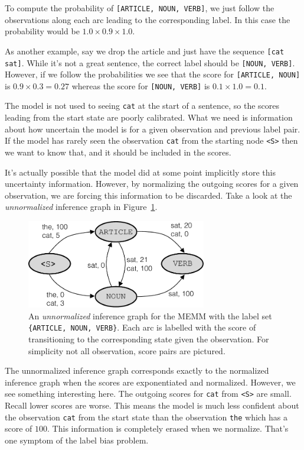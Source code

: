 \documentclass[11pt, letterpaper]{article}
\begin{document}
To compute the probability of \texttt{[ARTICLE, NOUN, VERB]}, we just follow the
observations along each arc leading to the corresponding label. In this case
the probability would be $1.0\!\times\!0.9\!\times\!1.0$.

As another example, say we drop the article and just have the sequence
\texttt{[cat sat]}. While it's not a great sentence, the correct label should
be \texttt{[NOUN, VERB]}. However, if we follow the probabilities we see that
the score for \texttt{[ARTICLE, NOUN]} is $0.9\!\times\!0.3\!=\!0.27$ whereas
the score for \texttt{[NOUN, VERB]} is $0.1\!\times\!1.0\!=\!0.1$.

The model is not used to seeing \texttt{cat} at the start of a sentence, so the
scores leading from the start state are poorly calibrated. What we need is
information about how uncertain the model is for a given observation and
previous label pair. If the model has rarely seen the observation \texttt{cat}
from the starting node \texttt{<S>} then we want to know that, and it should be
included in the scores.

It's actually possible that the model did at some point implicitly store this
uncertainty information. However, by normalizing the outgoing scores for a
given observation, we are forcing this information to be discarded. Take a look
at the \emph{unnormalized} inference graph in Figure~\ref{fig:memm_inf_unnorm}.

\begin{figure}
    \centering
    \includegraphics[width=0.7\textwidth]{figures/memm_inference_unnormalized.pdf}
    \caption{An \emph{unnormalized} inference graph for the MEMM with the label
    set \texttt{\{ARTICLE, NOUN, VERB\}}. Each arc is labelled with the score
    of transitioning to the corresponding state given the observation. For
    simplicity not all observation, score pairs are pictured.}
    \label{fig:memm_inf_unnorm}
\end{figure}

The unnormalized inference graph corresponds exactly to the normalized
inference graph when the scores are exponentiated and normalized. However, we
see something interesting here. The outgoing scores for \texttt{cat} from
\texttt{<S>} are small. Recall lower scores are worse. This means the model is
much less confident about the observation \texttt{cat} from the start state
than the observation \texttt{the} which has a score of $100$. This information
is completely erased when we normalize. That's one symptom of the label bias
problem.
\end{document}
